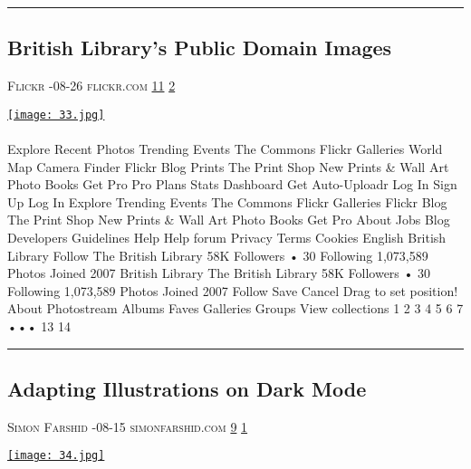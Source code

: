 \documentclass[10pt,a4paper]{article}
\begin{document}
\begin{multicols}{2}
\par\noindent\textcolor{red}{\rule{\linewidth}{0.2mm}}
\vfill
\null
\noindent\begin{minipage}{\linewidth}
\subsection{British Library's Public Domain Images}
\textsc{\footnotesize
{\scriptsize\faUser}\space 
Flickr 
{\scriptsize\faCalendar}-08-26 
{\scriptsize\faGlobe}\space 
flickr.com 
{\scriptsize\faThumbsOUp}\space 
\href{http://news.ycombinator.com/item?id=37165281\&utm\_term=comment}{11} 
{\scriptsize\faComments}\space 
\href{http://news.ycombinator.com/item?id=37165281\&utm\_term=comment}{2} 
}
\par\medskip\noindent
\href{https://www.flickr.com/photos/britishlibrary/albums/?utm\_source=hackernewsletter\&utm\_medium=email\&utm\_term=design}{
    \texttt{[image: 33.jpg]}
}
\end{minipage}
\paragraph{}
Explore
Recent Photos
Trending
Events
The Commons
Flickr Galleries
World Map
Camera Finder
Flickr Blog
Prints
The Print Shop
New
Prints \& Wall Art
Photo Books
Get Pro
Pro Plans
Stats Dashboard
Get Auto-Uploadr
Log In
Sign Up
Log In
Explore
Trending
Events
The Commons
Flickr Galleries
Flickr Blog
The Print Shop
New
Prints \& Wall Art
Photo Books
Get Pro
About
Jobs
Blog
Developers
Guidelines
Help
Help forum
Privacy
Terms
Cookies
English
British Library
Follow
The British Library
58K Followers
•
30 Following
1,073,589 Photos
Joined 2007
British Library
The British Library
58K Followers
•
30 Following
1,073,589 Photos
Joined 2007
Follow
Save
Cancel
Drag to set position!
About
Photostream
Albums
Faves
Galleries
Groups
View collections
1
2
3
4
5
6
7
•••
13
14
\par\noindent\textcolor{red}{\rule{\linewidth}{0.2mm}}
\vfill
\null
\noindent\begin{minipage}{\linewidth}
\subsection{Adapting Illustrations on Dark Mode}
\textsc{\footnotesize
{\scriptsize\faUser}\space 
Simon Farshid 
{\scriptsize\faCalendar}-08-15 
{\scriptsize\faGlobe}\space 
simonfarshid.com 
{\scriptsize\faThumbsOUp}\space 
\href{http://news.ycombinator.com/item?id=37133657\&utm\_term=comment}{9} 
{\scriptsize\faComments}\space 
\href{http://news.ycombinator.com/item?id=37133657\&utm\_term=comment}{1} 
}
\par\medskip\noindent
\href{https://blog.simonfarshid.com/adapting-illustrations-to-dark-mode?utm\_source=hackernewsletter\&utm\_medium=email\&utm\_term=design}{
    \texttt{[image: 34.jpg]}
}
\end{minipage}

\end{multicols}
\end{document}
